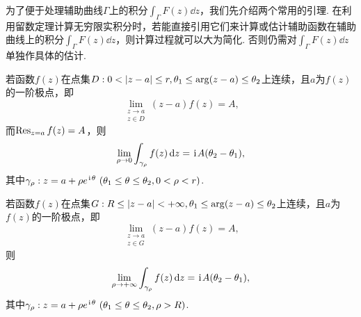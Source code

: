 为了便于处理辅助曲线\(\Gamma\)上的积分\(\int_{\Gamma} F(z) \dd{z}\)，我们先介绍两个常用的引理.
在利用留数定理计算无穷限实积分时，若能直接引用它们来计算或估计辅助函数在辅助曲线上的积分\(\int_{\Gamma} F(z) \dd{z}\)，则计算过程就可以大为简化.
否则仍需对\(\int_{\Gamma} F(z) \dd{z}\)单独作具体的估计.

\begin{lemma}\label{theorem:留数定理.计算积分路径上没有奇点的无穷限积分.引理1}
若函数\(f(z)\)在点集\(D: 0<\abs{z-a}\leq r, \theta_1 \leq \arg(z-a) \leq \theta_2\)上连续，且\(a\)为\(f(z)\)的一阶极点，即\begin{equation}
\lim\limits_{\substack{z \to a \\ z \in D}} (z-a) f(z) = A,
\end{equation}
而\(\operatorname{Res}_{z=a} f(z) = A\)，则\begin{equation}
\lim\limits_{\rho\to0} \int_{\gamma_{\rho}} f(z) \dd{z} = \kern1pt\mathrm{i}\kern1pt A (\theta_2-\theta_1),
\end{equation}
其中\(\gamma_{\rho}: z=a+\rho e^{\kern1pt\mathrm{i}\kern1pt\theta}\ (\theta_1 \leq \theta \leq \theta_2, 0 < \rho < r)\).

若函数\(f(z)\)在点集\(G: R \leq \abs{z-a} < +\infty, \theta_1 \leq \arg(z-a) \leq \theta_2\)上连续，且\(a\)为\(f(z)\)的一阶极点，即\begin{equation}
\lim\limits_{\substack{z \to a \\ z \in G}} (z-a) f(z) = A,
\end{equation}则\begin{equation}
\lim\limits_{\rho\to+\infty} \int_{\gamma_{\rho}} f(z) \dd{z} = \kern1pt\mathrm{i}\kern1pt A (\theta_2-\theta_1),
\end{equation}
其中\(\gamma_{\rho}: z=a+\rho e^{\kern1pt\mathrm{i}\kern1pt\theta}\ (\theta_1 \leq \theta \leq \theta_2, \rho > R)\).
\end{lemma}

